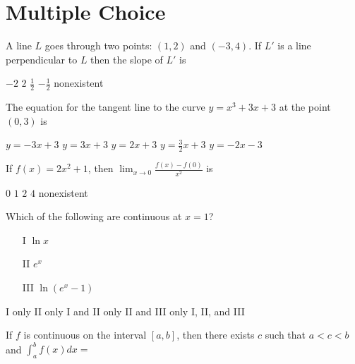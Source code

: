 \section{Multiple Choice}
\begin{questions}       

\question[2] A line $L$ goes through two points: $(1, 2)$ and $(-3,
        4)$. If $L'$ is a line perpendicular to $L$ then the slope of
        $L'$ is
    
    \begin{oneparchoices}
    \choice $-2$
    \choice $2$
    \choice $\frac{1}{2}$
    \CorrectChoice $-\frac{1}{2}$
    \choice nonexistent
    \end{oneparchoices}

\question[2] The equation for the tangent line to the curve $y = x^3 +
    3x + 3$ at the point $(0, 3)$ is

    \begin{oneparchoices}
    \CorrectChoice $y = -3x + 3$
    \choice $y = 3x + 3$
    \choice $y = 2x + 3$
    \choice $y = \frac{3}{2}x + 3$
    \choice $y = -2x - 3$
    \end{oneparchoices}

\question[2] If $f(x) = 2x^2 + 1$, then $\lim_{x \to 0} \frac{f(x) -
    f(0)}{x^2}$ is
    
    \begin{oneparchoices}
    \choice $0$
    \choice $1$
    \CorrectChoice $2$
    \choice $4$
    \choice nonexistent
    \end{oneparchoices}

\question[2] Which of the following are continuous at $x = 1$?
    \begin{enumerate}
    \item[I] $\ln x$
    \item[II] $e^{x}$
    \item[III] $\ln(e^{x} - 1)$
    \end{enumerate}

    \begin{oneparchoices}
    \choice I only
    \choice II only
    \choice I and II only
    \choice II and III only
    \CorrectChoice I, II, and III
    \end{oneparchoices}


\question[2] If $f$ is continuous on the interval $[a, b]$, then there
    exists $c$ such that $a < c< b$ and $\int_a^b f(x)dx = $


\end{questions}
